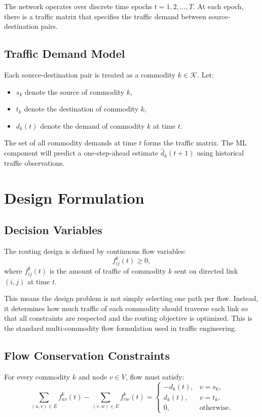 \documentclass[11pt]{article}
\begin{document}
The network operates over discrete time epochs $t = 1,2,\dots,T$. At each epoch, there is a traffic matrix that specifies the traffic demand between source-destination pairs.

\subsection{Traffic Demand Model}
Each source-destination pair is treated as a commodity $k \in \mathcal{K}$. Let:
\begin{itemize}
    \item $s_k$ denote the source of commodity $k$,
    \item $t_k$ denote the destination of commodity $k$,
    \item $d_k(t)$ denote the demand of commodity $k$ at time $t$.
\end{itemize}

The set of all commodity demands at time $t$ forms the traffic matrix. The ML component will predict a one-step-ahead estimate $\hat{d}_k(t+1)$ using historical traffic observations.

\section{Design Formulation}
\subsection{Decision Variables}
The routing design is defined by continuous flow variables:
\[
f_{ij}^{k}(t) \ge 0,
\]
where $f_{ij}^{k}(t)$ is the amount of traffic of commodity $k$ sent on directed link $(i,j)$ at time $t$.

This means the design problem is not simply selecting one path per flow. Instead, it determines how much traffic of each commodity should traverse each link so that all constraints are respected and the routing objective is optimized. This is the standard multi-commodity flow formulation used in traffic engineering.

\subsection{Flow Conservation Constraints}
For every commodity $k$ and node $v \in V$, flow must satisfy:
\[
\sum_{(u,v)\in E} f_{uv}^{k}(t) - \sum_{(v,w)\in E} f_{vw}^{k}(t) =
\begin{cases}
-d_k(t), & v = s_k, \\
d_k(t), & v = t_k, \\
0, & \text{otherwise.}
\end{cases}
\]
\end{document}
